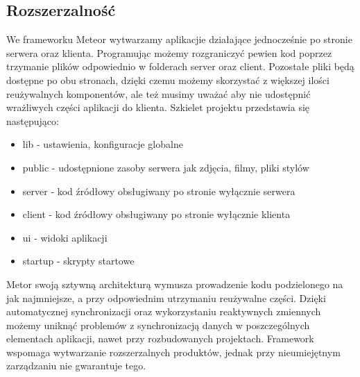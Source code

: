 \documentclass[12pt]{report}
\begin{document}
    \subsection{Rozszerzalność}
      We frameworku Meteor wytwarzamy aplikacjie działające jednocześnie po stronie serwera oraz klienta.
      Programując możemy rozgraniczyć pewien kod poprzez trzymanie plików odpowiednio w folderach server oraz client.
      Pozostałe pliki będą dostępne po obu stronach, dzięki czemu możemy skorzystać z większej ilości reużywalnych komponentów, ale też musimy uważać aby nie udostępnić wrażliwych części aplikacji do klienta.
      Szkielet projektu przedstawia się następująco:
      \begin{itemize}
        \item lib - ustawienia, konfiguracje globalne
        \item public - udostępnione zasoby serwera jak zdjęcia, filmy, pliki stylów
        \item server - kod źródłowy obsługiwany po stronie wyłącznie serwera
        \item client - kod źródłowy obsługiwany po stronie wyłącznie klienta
        \item ui - widoki aplikacji
        \item startup - skrypty startowe
      \end{itemize}
      Metor swoją sztywną architekturą wymusza prowadzenie kodu podzielonego na jak najmniejsze, a przy odpowiednim utrzymaniu reużywalne części.
      Dzięki automatycznej synchronizacji oraz wykorzystaniu reaktywnych zmiennych możemy uniknąć problemów z synchronizacją danych w poszczególnych elementach aplikacji, nawet przy rozbudowanych projektach.
      Framework wspomaga wytwarzanie rozszerzalnych produktów, jednak przy nieumiejętnym zarządzaniu nie gwarantuje tego.      
\end{document}

